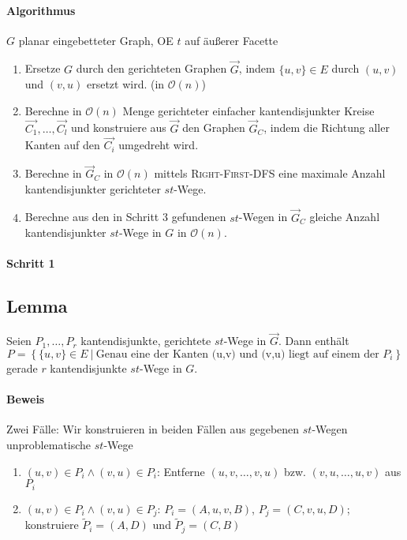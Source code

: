 \documentclass{article}
\renewcommand{\O}[1]{\mathcal{O}\left(#1\right)}
\newcommand{\set}[2]{\left\lbrace #1~|~#2 \right\rbrace}
\begin{document}
\paragraph{Algorithmus}
$G$ planar eingebetteter Graph, OE $t$ auf äußerer Facette
\begin{enumerate}
	\item Ersetze $G$ durch den gerichteten Graphen $\overrightarrow{G}$, indem $\{u,v\} \in E$ durch $(u,v)$ und $(v,u)$ ersetzt wird. (in $\O{n}$)
	\item Berechne in $\O{n}$ Menge gerichteter einfacher kantendisjunkter Kreise $\overrightarrow{C_1},\ldots, \overrightarrow{C_l}$ und konstruiere aus $\overrightarrow{G}$ den Graphen $\overrightarrow{G}_C$, indem die Richtung aller Kanten auf den $\overrightarrow{C_i}$ umgedreht wird.
	\item Berechne in $\overrightarrow{G}_C$ in $\O{n}$ mittels \textsc{Right-First-DFS} eine maximale Anzahl kantendisjunkter gerichteter $st$-Wege.
	\item Berechne aus den in Schritt 3 gefundenen $st$-Wegen in $\overrightarrow{G}_C$ gleiche Anzahl kantendisjunkter $st$-Wege in $G$ in $\O{n}$.
\end{enumerate}

\paragraph{Schritt 1}
\subsection{Lemma}
Seien $P_1, \ldots, P_r$ kantendisjunkte, gerichtete $st$-Wege in $\overrightarrow{G}$. Dann enthält
\[P = \set{\{u,v\} \in E}{\text{Genau eine der Kanten (u,v) und (v,u) liegt auf einem der }P_i}\]
gerade $r$ kantendisjunkte $st$-Wege in $G$.

\paragraph{Beweis}
Zwei Fälle: Wir konstruieren in beiden Fällen aus gegebenen $st$-Wegen unproblematische $st$-Wege
\begin{enumerate}
	\item $(u,v) \in P_i \wedge (v,u) \in P_i$: Entferne $(u, v, \ldots, v, u)$ bzw. $(v, u, \ldots, u, v)$ aus $P_i$
	\item $(u,v) \in P_i \wedge (v,u) \in P_j$: $P_i = (A, u, v, B)$, $P_j = (C, v, u, D)$; konstruiere $\widetilde{P}_i = (A, D)$ und $\widetilde{P}_j = (C, B)$
\end{enumerate}
\end{document}
